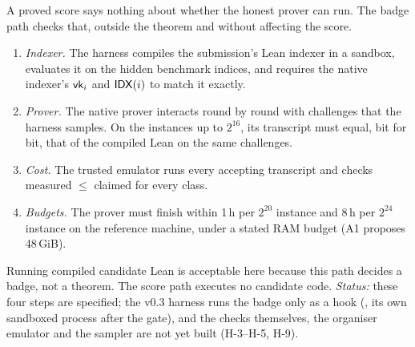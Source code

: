 A proved score says nothing about whether the honest prover can run. The badge path checks that,
outside the theorem and without affecting the score.
\begin{enumerate}[nosep]
\item \emph{Indexer.} The harness compiles the submission's Lean indexer in a sandbox, evaluates it on
  the hidden benchmark indices, and requires the native indexer's $\mathsf{vk}_i$ and $\mathsf{IDX}(i)$ to match it
  exactly.
\item \emph{Prover.} The native prover interacts round by round with challenges that the harness
  samples. On the instances up to $2^{16}$, its transcript must equal, bit for bit, that of the
  compiled Lean  on the same challenges.
\item \emph{Cost.} The trusted emulator runs every accepting transcript and checks measured $\le$
  claimed for every class.
\item \emph{Budgets.} The prover must finish within 1\,h per $2^{20}$ instance and 8\,h per $2^{24}$
  instance on the reference machine, under a stated RAM budget (A1 proposes 48\,GiB).
\end{enumerate}
Running compiled candidate Lean is acceptable here because this path decides a badge, not a theorem.
The score path executes no candidate code. \emph{Status:} these four steps are specified; the v0.3
harness runs the badge only as a hook (, its own sandboxed process after the gate), and
the checks themselves, the organiser emulator and the sampler are not yet built (H-3--H-5, H-9).

